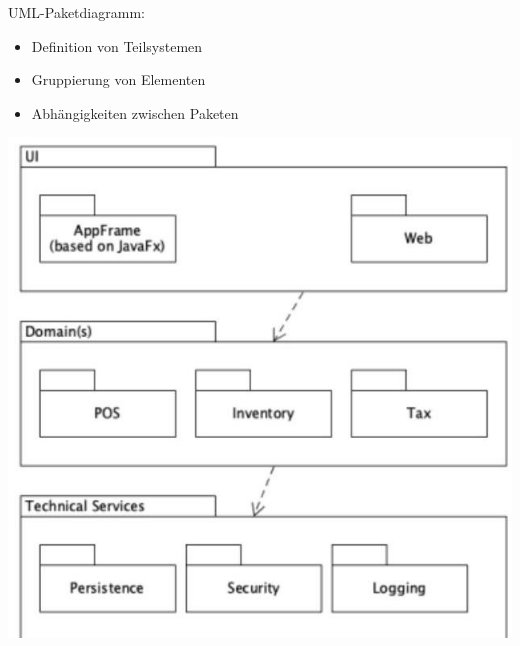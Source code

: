 \begin{definition}{UML-Paketdiagramm:}
\begin{itemize}
    \item Definition von Teilsystemen
    \item Gruppierung von Elementen
    \item Abhängigkeiten zwischen Paketen
\end{itemize}
\includegraphics[width=0.9\linewidth]{images/2024_12_29_0d1d7b5551ea1b4b41bdg-09(1)}
\end{definition}

